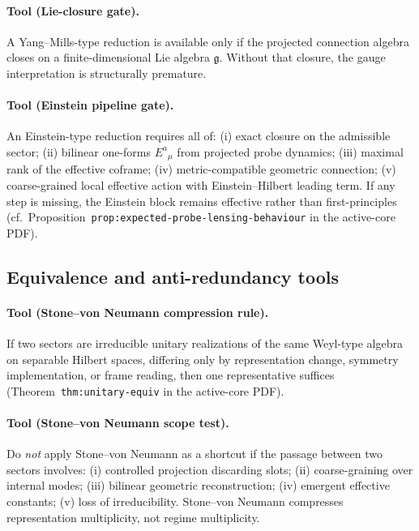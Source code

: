 \documentclass[12pt,a4paper]{article}
\begin{document}
\paragraph{Tool (Lie-closure gate).}
A Yang--Mills-type reduction is available only if the projected
connection algebra closes on a finite-dimensional Lie algebra
$\mathfrak{g}$. Without that closure, the gauge interpretation is
structurally premature.

\paragraph{Tool (Einstein pipeline gate).}
An Einstein-type reduction requires all of: (i) exact closure on the
admissible sector; (ii) bilinear one-forms $E^a{}_\mu$ from projected
probe dynamics; (iii) maximal rank of the effective coframe; (iv)
metric-compatible geometric connection; (v) coarse-grained local
effective action with Einstein--Hilbert leading term. If any step is
missing, the Einstein block remains effective rather than
first-principles
(cf.\ Proposition~\texttt{prop:expected-probe-lensing-behaviour} in the active-core PDF).

\subsection*{Equivalence and anti-redundancy tools}

\paragraph{Tool (Stone--von Neumann compression rule).}
If two sectors are irreducible unitary realizations of the same
Weyl-type algebra on separable Hilbert spaces, differing only by
representation change, symmetry implementation, or frame reading, then
one representative suffices
(Theorem~\texttt{thm:unitary-equiv} in the active-core PDF).

\paragraph{Tool (Stone--von Neumann scope test).}
Do \emph{not} apply Stone--von Neumann as a shortcut if the passage
between two sectors involves: (i) controlled projection discarding
slots; (ii) coarse-graining over internal modes; (iii) bilinear
geometric reconstruction; (iv) emergent effective constants; (v) loss
of irreducibility. Stone--von Neumann compresses representation
multiplicity, not regime multiplicity.
\end{document}
